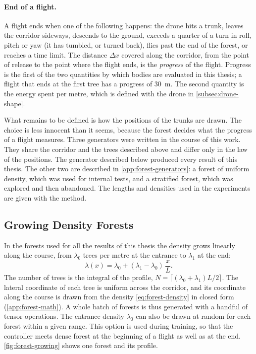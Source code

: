 \paragraph{End of a flight.} A flight ends when one of the following happens: the drone hits a trunk, leaves the corridor sideways, descends to the ground, exceeds a quarter of a turn in roll, pitch or yaw (it has tumbled, or turned back), flies past the end of the forest, or reaches a time limit. The distance $\Delta x$ covered along the corridor, from the point of release to the point where the flight ends, is the \emph{progress} of the flight. Progress is the first of the two quantities by which bodies are evaluated in this thesis; a flight that ends at the first tree has a progress of 30~m. The second quantity is the energy spent per metre, which is defined with the drone in \autoref{subsec:drone-shape}.

What remains to be defined is how the positions of the trunks are drawn. The choice is less innocent than it seems, because the forest decides what the progress of a flight measures. Three generators were written in the course of this work. They share the corridor and the trees described above and differ only in the law of the positions. The generator described below produced every result of this thesis. The other two are described in \autoref{app:forest-generators}: a forest of uniform density, which was used for internal tests, and a stratified forest, which was explored and then abandoned. The lengths and densities used in the experiments are given with the method.

\subsection{Growing Density Forests}
\label{subsec:forest-growing}

In the forests used for all the results of this thesis the density grows linearly along the course, from $\lambda_0$ trees per metre at the entrance to $\lambda_1$ at the end:
\begin{equation}
\lambda(x) = \lambda_0 + (\lambda_1 - \lambda_0)\,\frac{x}{L} .
\label{eq:forest-density}
\end{equation}
The number of trees is the integral of the profile, $N = \lceil (\lambda_0 + \lambda_1) L / 2 \rceil$. The lateral coordinate of each tree is uniform across the corridor, and its coordinate along the course is drawn from the density \eqref{eq:forest-density} in closed form (\autoref{app:forest-math}). A whole batch of forests is thus generated with a handful of tensor operations. The entrance density $\lambda_0$ can also be drawn at random for each forest within a given range. This option is used during training, so that the controller meets dense forest at the beginning of a flight as well as at the end. \autoref{fig:forest-growing} shows one forest and its profile.

